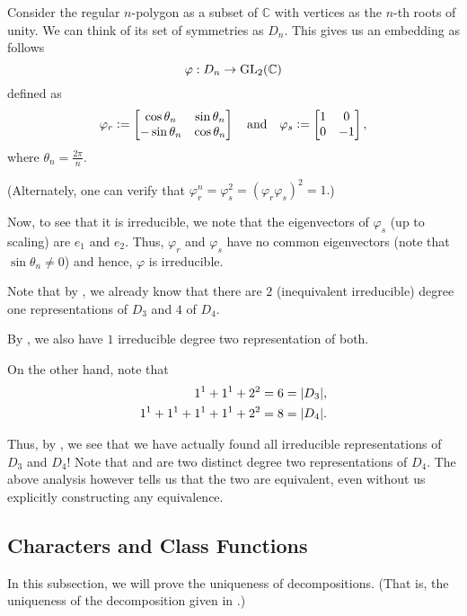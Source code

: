 \begin{ex} \label{ex:anirredrepDn}
	Consider the regular $n$-polygon as a subset of $\mathbb{C}$ with vertices as the $n$-th roots of unity. We can think of its set of symmetries as $D_n.$ This gives us an embedding as follows
	\begin{equation*} 
		\varphi : D_n \to \operatorname{GL}_2(\mathbb{C})
	\end{equation*}
	defined as
	\begin{equation*} 
		\varphi_r \vcentcolon= \begin{bmatrix} \cos \theta_n & \sin \theta_n \\ -\sin \theta_n & \cos \theta_n \end{bmatrix} \quad\text{and}\quad \varphi_s \vcentcolon= \begin{bmatrix} 1 & 0 \\ 0 & -1 \end{bmatrix},
	\end{equation*}
	where $\theta_n = \frac{2\pi}{n}.$ 

	(Alternately, one can verify that $\varphi_r^n = \varphi_s^2 = (\varphi_r\varphi_s)^2 = 1.$)

	Now, to see that it is irreducible, we note that the eigenvectors of $\varphi_s$ (up to scaling) are $e_1$ and $e_2.$ Thus, $\varphi_r$ and $\varphi_s$ have no common eigenvectors (note that $\sin\theta_n \neq 0$) and hence, $\varphi$ is irreducible.
\end{ex}

\begin{ex}
	Note that by , we already know that there are $2$ (inequivalent irreducible) degree one representations of $D_3$ and $4$ of $D_4.$

	By , we also have $1$ irreducible degree two representation of both.

	On the other hand, note that
	\begin{align*} 
		1^1 + 1^1 + 2^2 &= 6 = {\left\lvert D_3 \right\lvert},\\
		1^1 + 1^1 + 1^1 + 1^1 + 2^2 &= 8 = {\left\lvert D_4 \right\lvert}.
	\end{align*}

	Thus, by , we see that we have actually found all irreducible representations of $D_3$ and $D_4$! Note that  and  are two distinct degree two representations of $D_4.$ The above analysis however tells us that the two are equivalent, even without us explicitly constructing any equivalence.
\end{ex}

\subsection{Characters and Class Functions}
In this subsection, we will prove the uniqueness of decompositions. (That is, the uniqueness of the decomposition given in .)

